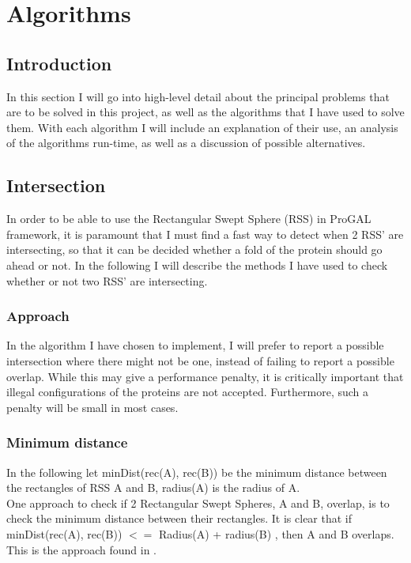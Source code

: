 
\section{Algorithms}
\label{algorithms}
\subsection{Introduction}
In this section I will go into high-level detail about the principal problems that are to be solved in this project, as well as the algorithms that I have used to solve them. With each algorithm I will include an explanation of their use, an analysis of the algorithms run-time, as well as a discussion of possible alternatives. 

\subsection{Intersection}
\label{intersection}
In order to be able to use the Rectangular Swept Sphere (RSS) in ProGAL framework, it is paramount that I must find a fast way to detect when 2 RSS' are intersecting, so that it can be decided whether a fold of the protein should go ahead or not. In the following I will describe the methods I have used to check whether or not two RSS' are intersecting.

\subsubsection{Approach}
In the algorithm I have chosen to implement, I will prefer to report a possible intersection where there might not be one, instead of failing to report a possible overlap. While this may give a performance penalty, it is critically important that illegal configurations of the proteins are not accepted. Furthermore, such a penalty will be small in most cases.

\subsubsection{Minimum distance}
In the following let minDist(rec(A), rec(B)) be the minimum distance between the rectangles of RSS A and B, radius(A) is the radius of A.\\

One approach to check if 2 Rectangular Swept Spheres, A and B, overlap, is to check the minimum distance between their rectangles. It is clear that if minDist(rec(A), rec(B)) $<=$ Radius(A) + radius(B) , then A and B overlaps. This is the approach found in \cite{Larsen99fastproximity}.

